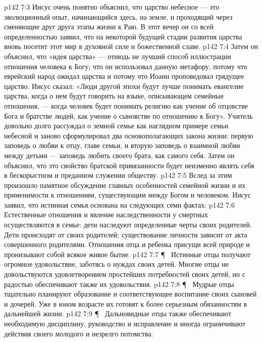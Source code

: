 \vs p142 7:3 Иисус очень понятно объяснил, что царство небесное --- это эволюционный опыт, начинающийся здесь, на земле, и проходящий через сменяющие друг друга этапы жизни к Раю. В этот вечер он со всей определенностью заявил, что на некоторой будущей стадии развития царства вновь посетит этот мир в духовной силе и божественной славе.
\vs p142 7:4 Затем он объяснил, что «идея царства» --- отнюдь не лучший способ иллюстрации отношения человека к Богу; что он использовал данную метафору, потому что еврейский народ ожидал царства и потому что Иоанн проповедовал грядущее царство. Иисус сказал: «Люди другой эпохи будут лучше понимать евангелие царства, когда о нем будут говорить на языке, описывающем семейные отношения, --- когда человек будет понимать религию как учение об отцовстве Бога и братстве людей, как учение о сыновстве по отношению к Богу». Учитель довольно долго рассуждал о земной семье как наглядном примере семьи небесной и заново сформулировал два основополагающих закона жизни: первую заповедь о любви к отцу, главе семьи, и вторую заповедь о взаимной любви между детьми --- заповедь любить своего брата, как самого себя. Затем он объяснил, что это свойство братской привязанности будет неизменно являть себя в бескорыстном и преданном служении обществу.
\vs p142 7:5 Вслед за этим произошло памятное обсуждение главных особенностей семейной жизни и их применимости к отношениям, существующим между Богом и человеком. Иисус заявил, что истинная семья основана на следующих семи фактах:
\vs p142 7:6 \bibnobreakspace {} Естественные отношения и явление наследственности у смертных осуществляются в семье: дети наследуют определенные черты своих родителей. Дети происходят от своих родителей; существование личности зависит от акта совершенного родителями. Отношения отца и ребенка присущи всей природе и пронизывают собой всякое живое бытие.
\vs p142 7:7 \P\ \bibnobreakspace {} Истинные отцы получают огромное удовольствие, заботясь о нуждах своих детей. Многие отцы не довольствуются удовлетворением простейших потребностей своих детей, но с радостью обеспечивают также их удовольствия.
\vs p142 7:8 \P\ \bibnobreakspace {} Мудрые отцы тщательно планируют образование и соответствующее воспитание своих сыновей и дочерей. Уже в юном возрасте их готовят к более серьезным обязанностям в дальнейшей жизни.
\vs p142 7:9 \P\ \bibnobreakspace {}  Дальновидные отцы также обеспечивают необходимую дисциплину, руководство и исправление и иногда ограничивают действия своего молодого и незрелго потомства.
